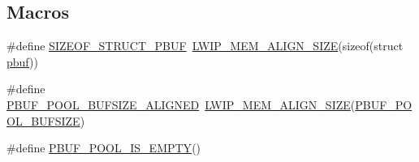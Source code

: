 \subsection*{Macros}
\begin{DoxyCompactItemize}
\item 
\#define \hyperlink{openmote-cc2538_2lwip_2src_2core_2pbuf_8c_a8357a994e45ff94c9494aa55b6c3ecb3}{S\+I\+Z\+E\+O\+F\+\_\+\+S\+T\+R\+U\+C\+T\+\_\+\+P\+B\+UF}~\hyperlink{group__compiler__abstraction_gaef204be511fd32f681b55abc08e9ae18}{L\+W\+I\+P\+\_\+\+M\+E\+M\+\_\+\+A\+L\+I\+G\+N\+\_\+\+S\+I\+ZE}(sizeof(struct \hyperlink{structpbuf}{pbuf}))
\item 
\#define \hyperlink{openmote-cc2538_2lwip_2src_2core_2pbuf_8c_a3dad81a8286ee8e9a7c70a74f9f4bb0f}{P\+B\+U\+F\+\_\+\+P\+O\+O\+L\+\_\+\+B\+U\+F\+S\+I\+Z\+E\+\_\+\+A\+L\+I\+G\+N\+ED}~\hyperlink{group__compiler__abstraction_gaef204be511fd32f681b55abc08e9ae18}{L\+W\+I\+P\+\_\+\+M\+E\+M\+\_\+\+A\+L\+I\+G\+N\+\_\+\+S\+I\+ZE}(\hyperlink{group__lwip__opts__pbuf_gae61f4491d56e805e79b79eb5d35a00e5}{P\+B\+U\+F\+\_\+\+P\+O\+O\+L\+\_\+\+B\+U\+F\+S\+I\+ZE})
\item 
\#define \hyperlink{openmote-cc2538_2lwip_2src_2core_2pbuf_8c_aed70c61e971683736c569a1a99b76569}{P\+B\+U\+F\+\_\+\+P\+O\+O\+L\+\_\+\+I\+S\+\_\+\+E\+M\+P\+TY}()
\end{DoxyCompactItemize}
